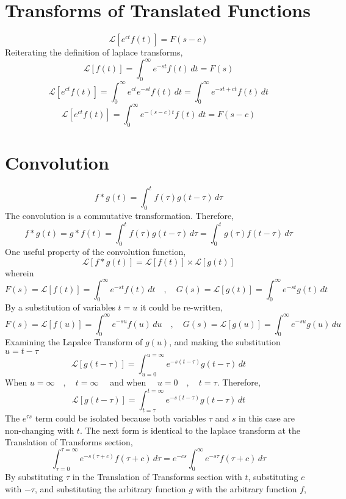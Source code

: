\section{Transforms of Translated Functions}
\begin{comment}
\end{comment}
$$\mathcal{L}[e^{ct}f(t)] = F(s-c)$$
Reiterating the definition of laplace transforms,
$$\mathcal{L}[f(t)] = \int^{\infty}_{0}e^{-st}f(t)\,dt = F(s)$$
$$\mathcal{L}[e^{ct}f(t)] = \int^{\infty}_{0}e^{ct}e^{-st}f(t)\,dt = \int^{\infty}_{0}e^{-st + ct}f(t)\,dt$$
$$\mathcal{L}[e^{ct}f(t)] = \int^{\infty}_{0}e^{-(s-c)t}f(t)\,dt = F(s-c)$$
\section{Convolution}
\begin{comment}
\end{comment}
$$f*g(t) = \int^{t}_{0}f(\tau)g(t - \tau)\,d\tau$$
The convolution is a commutative transformation. Therefore,
$$f*g(t) = g*f(t) = \int^{t}_{0}f(\tau)g(t - \tau)\,d\tau = \int^{t}_{0}g(\tau)f(t - \tau)\,d\tau$$
One useful property of the convolution function,
$$\mathcal{L}\left[f*g(t)\right] = \mathcal{L}\left[f(t)\right]\times\mathcal{L}\left[g(t)\right]$$
wherein
$$F(s) = \mathcal{L}[f(t)] = \int^{\infty}_{0}e^{-st}f(t)\,dt\quad,\quad G(s) = \mathcal{L}[g(t)] = \int^{\infty}_{0}e^{-st}g(t)\,dt$$
By a substitution of variables $t = u$ it could be re-written,
$$F(s) = \mathcal{L}[f(u)] = \int^{\infty}_{0}e^{-su}f(u)\,du\quad,\quad G(s) = \mathcal{L}[g(u)] = \int^{\infty}_{0}e^{-su}g(u)\,du$$
Examining the Lapalce Transform of $g(u)$, and making the substitution $u = t-\tau$
$$\mathcal{L}[g(t-\tau)] = \int^{u = \infty}_{u = 0}e^{-s(t-\tau)}g(t-\tau)\,dt$$
When $\displaystyle{u = \infty\quad,\quad t=\infty}\quad$ and when $\quad\displaystyle{u = 0 \quad,\quad t = \tau}$. Therefore,
$$\mathcal{L}[g(t-\tau)] = \int^{t = \infty}_{t = \tau}e^{-s(t-\tau)}g(t-\tau)\,dt$$
The $\displaystyle{e^{\tau s}}$ term could be isolated because both variables $\tau$ and $s$ in this case are non-changing with $t$. The next form is identical to the laplace transform at the Translation of Transforms section,
$$\int^{\tau = \infty}_{\tau = 0}e^{-s(\tau + c)}f(\tau + c)\,d\tau = e^{-cs}\int^{\infty}_{0}e^{-s\tau}f(\tau + c)\,d\tau$$
By substituting $\tau$ in the Translation of Transforms section with $t$, substituting $c$ with $-\tau$, and substituting the arbitrary function $g$ with the arbitrary function $f$,
